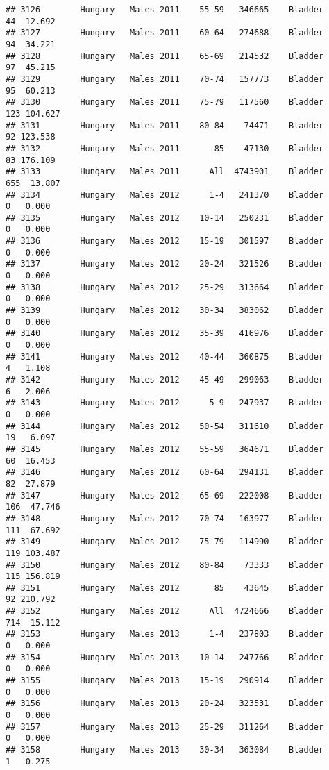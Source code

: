 \documentclass[
]{article}
\begin{document}
\begin{verbatim}
## 3126        Hungary   Males 2011    55-59   346665    Bladder     44  12.692
## 3127        Hungary   Males 2011    60-64   274688    Bladder     94  34.221
## 3128        Hungary   Males 2011    65-69   214532    Bladder     97  45.215
## 3129        Hungary   Males 2011    70-74   157773    Bladder     95  60.213
## 3130        Hungary   Males 2011    75-79   117560    Bladder    123 104.627
## 3131        Hungary   Males 2011    80-84    74471    Bladder     92 123.538
## 3132        Hungary   Males 2011       85    47130    Bladder     83 176.109
## 3133        Hungary   Males 2011      All  4743901    Bladder    655  13.807
## 3134        Hungary   Males 2012      1-4   241370    Bladder      0   0.000
## 3135        Hungary   Males 2012    10-14   250231    Bladder      0   0.000
## 3136        Hungary   Males 2012    15-19   301597    Bladder      0   0.000
## 3137        Hungary   Males 2012    20-24   321526    Bladder      0   0.000
## 3138        Hungary   Males 2012    25-29   313664    Bladder      0   0.000
## 3139        Hungary   Males 2012    30-34   383062    Bladder      0   0.000
## 3140        Hungary   Males 2012    35-39   416976    Bladder      0   0.000
## 3141        Hungary   Males 2012    40-44   360875    Bladder      4   1.108
## 3142        Hungary   Males 2012    45-49   299063    Bladder      6   2.006
## 3143        Hungary   Males 2012      5-9   247937    Bladder      0   0.000
## 3144        Hungary   Males 2012    50-54   311610    Bladder     19   6.097
## 3145        Hungary   Males 2012    55-59   364671    Bladder     60  16.453
## 3146        Hungary   Males 2012    60-64   294131    Bladder     82  27.879
## 3147        Hungary   Males 2012    65-69   222008    Bladder    106  47.746
## 3148        Hungary   Males 2012    70-74   163977    Bladder    111  67.692
## 3149        Hungary   Males 2012    75-79   114990    Bladder    119 103.487
## 3150        Hungary   Males 2012    80-84    73333    Bladder    115 156.819
## 3151        Hungary   Males 2012       85    43645    Bladder     92 210.792
## 3152        Hungary   Males 2012      All  4724666    Bladder    714  15.112
## 3153        Hungary   Males 2013      1-4   237803    Bladder      0   0.000
## 3154        Hungary   Males 2013    10-14   247766    Bladder      0   0.000
## 3155        Hungary   Males 2013    15-19   290914    Bladder      0   0.000
## 3156        Hungary   Males 2013    20-24   323531    Bladder      0   0.000
## 3157        Hungary   Males 2013    25-29   311264    Bladder      0   0.000
## 3158        Hungary   Males 2013    30-34   363084    Bladder      1   0.275

\end{verbatim}
\end{document}
